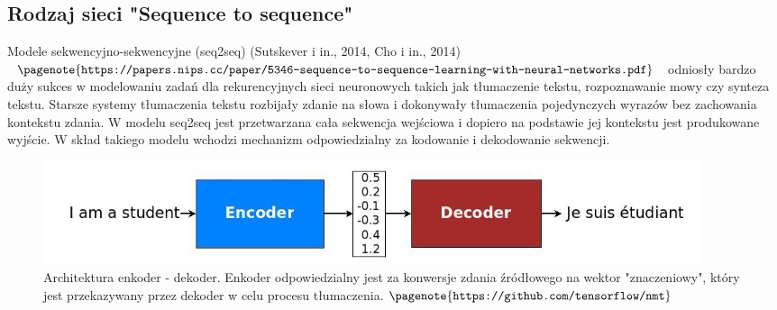 	\subsection{Rodzaj sieci "Sequence to sequence"}
	
	Modele sekwencyjno-sekwencyjne (seq2seq) (Sutskever i in., 2014, Cho i in., 2014)$\pagenote{\texttt{https://papers.nips.cc/paper/5346-sequence-to-sequence-learning-with-neural-networks.pdf}}$ odniosły bardzo duży sukces w modelowaniu zadań dla rekurencyjnych sieci neuronowych takich jak tłumaczenie tekstu, rozpoznawanie mowy czy synteza tekstu. Starsze systemy tłumaczenia tekstu rozbijały zdanie na słowa i dokonywały tłumaczenia pojedynczych wyrazów bez zachowania kontekstu zdania. W modelu seq2seq jest przetwarzana cała sekwencja wejściowa i dopiero na podstawie jej kontekstu jest produkowane wyjście. W skład takiego modelu wchodzi mechanizm odpowiedzialny za kodowanie i dekodowanie sekwencji.
	
	\begin{figure}[H]
		\centering
		\includegraphics[width=0.7\linewidth]{encoder_decoder}
		\caption{Architektura enkoder - dekoder. Enkoder odpowiedzialny jest za konwersje zdania źródłowego na wektor "znaczeniowy", który jest przekazywany przez dekoder w celu procesu tłumaczenia.$\pagenote{\texttt{https://github.com/tensorflow/nmt}}$ }
		\label{fig:encoderdecoder}
	\end{figure}

